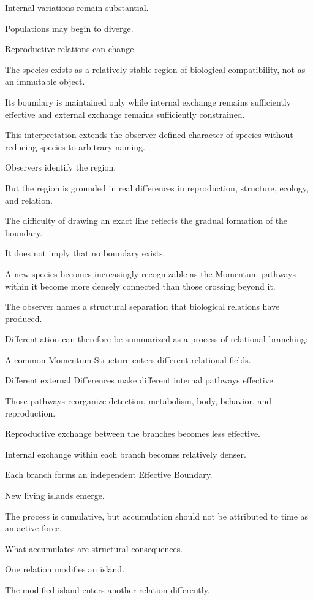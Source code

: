 Internal variations remain substantial.

Populations may begin to diverge.

Reproductive relations can change.

The species exists as a relatively stable region of biological compatibility, not as an immutable object.

Its boundary is maintained only while internal exchange remains sufficiently effective and external exchange remains sufficiently constrained.

This interpretation extends the observer-defined character of species without reducing species to arbitrary naming.

Observers identify the region.

But the region is grounded in real differences in reproduction, structure, ecology, and relation.

The difficulty of drawing an exact line reflects the gradual formation of the boundary.

It does not imply that no boundary exists.

A new species becomes increasingly recognizable as the Momentum pathways within it become more densely connected than those crossing beyond it.

The observer names a structural separation that biological relations have produced.

Differentiation can therefore be summarized as a process of relational branching:

A common Momentum Structure enters different relational fields.

Different external Differences make different internal pathways effective.

Those pathways reorganize detection, metabolism, body, behavior, and reproduction.

Reproductive exchange between the branches becomes less effective.

Internal exchange within each branch becomes relatively denser.

Each branch forms an independent Effective Boundary.

New living islands emerge.

The process is cumulative, but accumulation should not be attributed to time as an active force.

What accumulates are structural consequences.

One relation modifies an island.

The modified island enters another relation differently.

